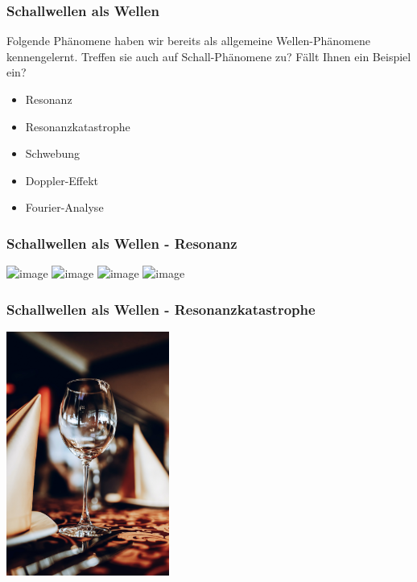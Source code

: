 \documentclass{beamer}
\begin{document}
\begin{frame}

\frametitle{Schallwellen als Wellen}

Folgende Phänomene haben wir bereits als allgemeine Wellen-Phänomene kennengelernt. Treffen sie auch auf Schall-Phänomene zu? Fällt Ihnen ein Beispiel ein?


\begin{itemize}
\item
 Resonanz
\item
Resonanzkatastrophe
\item
 Schwebung
\item
 Doppler-Effekt
\item
Fourier-Analyse
\end{itemize}

\end{frame}

\begin{frame}
\frametitle{Schallwellen als Wellen - Resonanz}


\begin{center}
\includegraphics<1>[width=\textwidth]{piano_experiment_1.png}
\includegraphics<2>[width=\textwidth]{piano_experiment_2.png}
\includegraphics<3>[width=\textwidth]{piano_experiment_3.png}
\includegraphics<4>[width=\textwidth]{piano_experiment_4.png}

\end{center}

\end{frame}



\begin{frame}
\frametitle{Schallwellen als Wellen - Resonanzkatastrophe}

\begin{center}
\includegraphics[width=0.4\textwidth]{wine_glass.jpg}
\end{center}


\end{frame}
\end{document}
